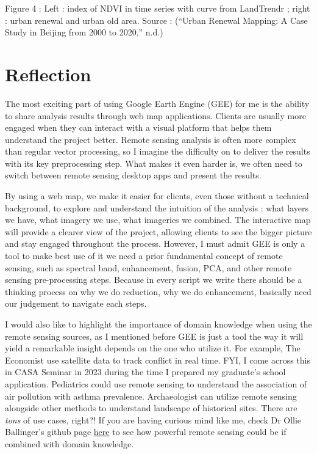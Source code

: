 \documentclass[
  letterpaper,
  DIV=11,
  numbers=noendperiod]{scrreprt}
\begin{document}
Figure 4 : Left : index of NDVI in time series with curve from
LandTrendr ; right : urban renewal and urban old area. Source :
({``Urban Renewal Mapping: A Case Study in Beijing from 2000 to 2020,''}
n.d.)

\hypertarget{reflection-2}{%
\section{Reflection}\label{reflection-2}}

The most exciting part of using Google Earth Engine (GEE) for me is the
ability to share analysis results through web map applications. Clients
are usually more engaged when they can interact with a visual platform
that helps them understand the project better. Remote sensing analysis
is often more complex than regular vector processing, so I imagine the
difficulty on to deliver the results with its key preprocessing step.
What makes it even harder is, we often need to switch between remote
sensing desktop apps and present the results.

By using a web map, we make it easier for clients, even those without a
technical background, to explore and understand the intuition of the
analysis : what layers we have, what imagery we use, what imageries we
combined. The interactive map will provide a clearer view of the
project, allowing clients to see the bigger picture and stay engaged
throughout the process. However, I must admit GEE is only a tool to make
best use of it we need a prior fundamental concept of remote sensing,
such as spectral band, enhancement, fusion, PCA, and other remote
sensing pre-processing steps. Because in every script we write there
should be a thinking process on why we do reduction, why we do
enhancement, basically need our judgement to navigate each steps.

I would also like to highlight the importance of domain knowledge when
using the remote sensing sources, as I mentioned before GEE is just a
tool the way it will yield a remarkable insight depends on the one who
utilize it. For example, The Economist use satellite data to track
conflict in real time. FYI, I come across this in CASA Seminar in 2023
during the time I prepared my graduate's school application. Pediatrics
could use remote sensing to understand the association of air pollution
with asthma prevalence. Archaeologist can utilize remote sensing
alongside other methods to understand landscape of historical sites.
There are \emph{tons} of use cases, right?! If you are having curious
mind like me, check Dr Ollie Ballinger's github page
\href{https://oballinger.github.io/\#}{here} to see how powerful remote
sensing could be if combined with domain knowledge.
\end{document}
